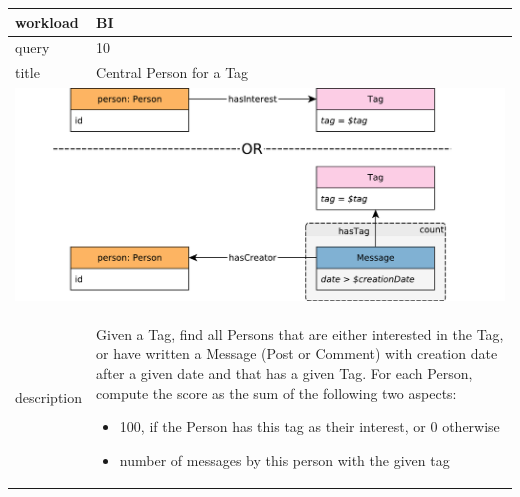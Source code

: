 \renewcommand*{\arraystretch}{1.1}

\noindent\begin{tabularx}{17cm}{|p{1.95cm}|X|}
	\hline
	workload    & BI \\ \hline
%
	query       & 10 \\ \hline
%
	title       & Central Person for a Tag \\ \hline
	\multicolumn{2}{|c|}{ \includegraphics[scale=\patternscale,margin=0cm .2cm]{patterns/bi10}} \\ \hline
	description & Given a Tag, find all Persons that are either interested in the Tag, or
have written a Message (Post or Comment) with creation date after a
given date and that has a given Tag. For each Person, compute the score
as the sum of the following two aspects:

\begin{itemize}
\tightlist
\item
  100, if the Person has this tag as their interest, or 0 otherwise
\item
  number of messages by this person with the given tag
\end{itemize}
 \\ \hline
	

\end{tabularx}
